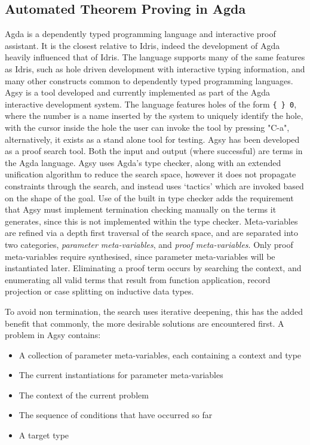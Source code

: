 \documentclass[a4paper]{article}
\begin{document}
\subsection{Automated Theorem Proving in Agda}
\label{sec:org9bbd902}
Agda is a dependently typed programming language and interactive proof 
assistant. It is the closest relative to Idris, indeed the development 
of Agda heavily influenced that of Idris. The language supports many
of the same features as Idris, such as hole driven development with 
interactive typing information, and many other constructs common to 
dependently typed programming languages. Agsy is a tool developed and 
currently implemented as part of the Agda interactive development system.
The language features holes of the form \texttt{\{ \} 0}, where the 
number is a name inserted by the system to uniquely identify the hole,
with the cursor inside the hole the user 
can invoke the tool by pressing "C-a", alternatively, it exists as a 
stand alone tool for testing. Agsy has been developed as a proof search 
tool. Both the input and output (where successful) are terms in the Agda 
language. Agsy uses Agda's type checker, along with an extended 
unification algorithm to reduce the search space, however it does not 
propagate constraints through the search, and instead uses `tactics' 
which are invoked based on the shape of the goal. Use of the built in 
type checker adds the requirement that Agsy must implement termination
checking manually on the terms it generates, since this is not 
implemented within the type checker. Meta-variables are refined via a 
depth first traversal of the search space, and are separated into 
two categories, \emph{parameter meta-variables}, and \emph{proof meta-variables}.
Only proof meta-variables require synthesised, since parameter 
meta-variables will be instantiated later. Eliminating a proof term
occurs by searching the context, and enumerating all valid terms that 
result from function application, record projection or case splitting on
inductive data types.

To avoid non termination, the search uses iterative deepening, this has
the added benefit that commonly, the more desirable solutions are 
encountered first. A problem in Agsy contains:
\begin{itemize}
\item A collection of parameter meta-variables, each containing a context and type
\item The current instantiations for parameter meta-variables
\item The context of the current problem
\item The sequence of conditions that have occurred so far
\item A target type
\end{itemize}
\end{document}
